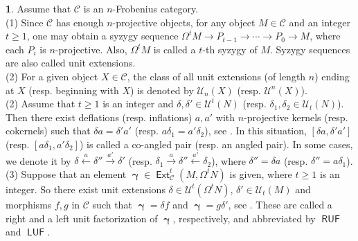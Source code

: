 \documentclass[11pt,a4paper]{amsart}
\newcommand{\rt}{\rightarrow}
\newcommand{\lrt}{\longrightarrow}
\newcommand{\llf}{\longleftarrow}
\newcommand{\st}{\stackrel}
\newcommand{\C}{\mathscr{C} }
\def\Ext{\operatorname{{\mathsf{Ext}}}}
\def\syz{\mathsf{\Omega}}
\def\U{\mathcal U}
\def\ruf{\operatorname{\mathsf{RUF}}}
\def\luf{\operatorname{\mathsf{LUF}}}
\def\ga{\operatorname{\boldsymbol{\gamma}}}
\theoremstyle{definition}
\newtheorem{s}[theorem]{}
\theoremstyle{plain}
\theoremstyle{definition}
\numberwithin{equation}{section}
\begin{document}
\begin{s}\label{ss}Assume that $\C$ is an $n$-Frobenius category.\\
(1) Since $\C$ has enough $n$-projective objects, for any object $M\in\C$ and an integer $t\geq 1$, one may obtain a syzygy sequence  $\syz^tM\rt P_{t-1}\rt\cdots\rt P_0\rt M$, where each $P_i$ is  $n$-projective.  Also, $\syz^tM$ is called a $t$-th syzygy of $M$. Syzygy sequences are also called unit extensions.\\ (2)  For a given object $X\in\C$, the class of all  unit  extensions (of length $n$)  ending at  $X$ (resp.  beginning with  $X$) is denoted by $\U_n(X)$ (resp.  {$\U^n(X)$}).\\ (2) Assume that $t\geq 1$ is an integer and $\delta, \delta' \in \U^t(N)$ (resp. $\delta_1, \delta_2 \in\U_t(N)$). Then there exist deflations (resp. inflations) $a, a'$ with $n$-projective kernels (resp. cokernels) such that $\delta a=\delta'a'$ (resp. $a\delta_1=a'\delta_2$), see \cite[Proposition 5.5]{bfss}. In this situation, $[\delta a, \delta'a']$  (resp. $[a\delta_1, a'\delta_2]$) is called a co-angled pair (resp. an angled pair). In some cases, we denote it by $\delta\st{a}\llf\delta''\st{a'}\lrt\delta'$ (resp. $\delta_1\st{a}\lrt\delta''\st{a'}\llf\delta_2$), where $\delta''=\delta a$  (resp. $\delta''=a\delta_1$).\\ (3) Suppose that an element $\ga\in\Ext^t_{\C}(M, \syz^tN)$ is given, where $t\geq 1$ is an integer. So there exist unit extensions $\delta\in\U^t(\syz^t N)$, $\delta'\in\U_t(M)$ and morphisms $f,g$ in $\C$ such that $\ga=\delta f$ and $\ga=g\delta'$, see \cite[Proposition 5.2]{bfss}. These are called a right and a left unit factorization of $\ga$, respectively, and abbreviated by $\ruf$ and $\luf$.
\end{s}
\end{document}
